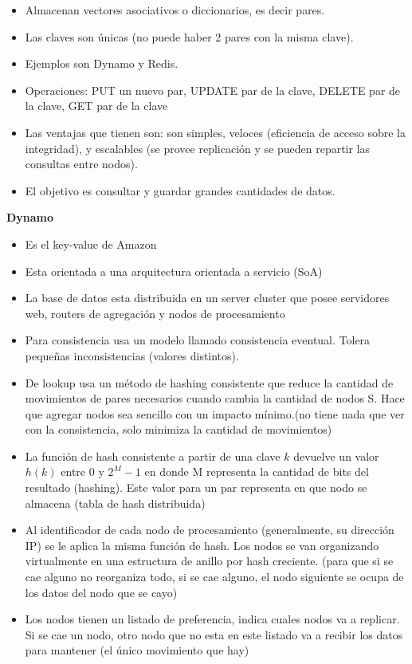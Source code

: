\begin{itemize}
\item Almacenan vectores asociativos o diccionarios, es decir pares.
\item Las claves son únicas (no puede haber 2 pares con la misma clave).
\item Ejemplos son Dynamo y Redis.
\item Operaciones: PUT un nuevo par, UPDATE par de la clave, DELETE par de la clave, GET par de la clave
\item Las ventajas que tienen son: son simples, veloces (eficiencia de acceso sobre la integridad), y escalables (se provee replicación y se pueden repartir las consultas entre nodos).
\item El objetivo es consultar y guardar grandes cantidades de datos.
\end{itemize}

\bigskip
\textbf{Dynamo}\\
\begin{itemize}
\item Es el key-value de Amazon
\item Esta orientada a una arquitectura orientada a servicio (SoA)
\item La base de datos esta distribuida en un server cluster que posee servidores web, routers de agregación y nodos de procesamiento
\item Para consistencia usa un modelo llamado consistencia eventual. Tolera pequeñas inconsistencias (valores distintos).
\item De lookup usa un método de hashing consistente que reduce la cantidad de movimientos de pares necesarios cuando cambia la cantidad de nodos S. Hace que agregar nodos sea sencillo con un impacto mínimo.(no tiene nada que ver con la consistencia, solo minimiza la cantidad de movimientos)
\item La función de hash consistente a partir de una clave $k$ devuelve un valor $h(k)$ entre 0 y $2^M -1$ en donde M representa la cantidad de bits del resultado (hashing). Este valor para un par representa en que nodo se almacena (tabla de hash distribuida)
\item Al identificador de cada nodo de procesamiento (generalmente, su dirección IP) se le aplica la misma función de hash. Los nodos se van organizando virtualmente en una estructura de anillo por hash creciente. (para que si se cae alguno no reorganiza todo, si se cae alguno, el nodo siguiente se ocupa de los datos del nodo que se cayo)
\item Los nodos tienen un listado de preferencia, indica cuales nodos va a replicar. Si se cae un nodo, otro nodo que no esta en este listado va a recibir los datos para mantener (el único movimiento que hay)
\end{itemize}


